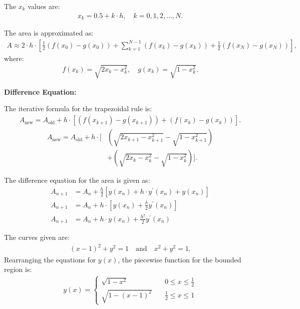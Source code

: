 \documentclass[journal]{IEEEtran}
\begin{document}
The $x_k$ values are:
\begin{align}
    x_k = 0.5 + k \cdot h, \quad k = 0, 1, 2, \dots, N.
\end{align}

The area is approximated as:
\begin{align}
    A \approx 2 \cdot h \cdot \left[ \frac{1}{2}(f(x_0) - g(x_0)) + \sum_{k=1}^{N-1} (f(x_k) - g(x_k)) + \frac{1}{2}(f(x_N) - g(x_N)) \right],
\end{align}
where:
\begin{align}
    f(x_k) = \sqrt{2x_k - x_k^2}, \quad g(x_k) = \sqrt{1 - x_k^2}.
\end{align}

\textbf{Difference Equation:}

The iterative formula for the trapezoidal rule is:
\begin{align}
    A_{\text{new}} = A_{\text{old}} + h \cdot \left[(f(x_{k+1}) - g(x_{k+1})) + (f(x_k) - g(x_k)) \right].
\end{align}
\begin{align}
    A_{\text{new}} = A_{\text{old}} + h \cdot \bigg[ & \left(\sqrt{2x_{k+1} - x_{k+1}^2} - \sqrt{1 - x_{k+1}^2}\right) \nonumber \\
    & + \left(\sqrt{2x_k - x_k^2} - \sqrt{1 - x_k^2}\right) \bigg].
\end{align}

The difference equation for the area is given as:
\begin{align}
    A_{n + 1} &= A_n + \frac{h}{2} \left[ y(x_n) + h \cdot y^{\prime}(x_n) + y(x_n) \right] \\
    A_{n + 1} &= A_n + h \cdot \left[ y(x_n) + \frac{h}{2} y^{\prime}(x_n) \right] \\
    A_{n + 1} &= A_n + h \cdot y(x_n) + \frac{h^2}{2} y^{\prime}(x_n)
\end{align}

The curves given are:
\begin{align}
    (x - 1)^2 + y^2 = 1 \quad \text{and} \quad x^2 + y^2 = 1.
\end{align}
Rearranging the equations for \( y(x) \), the piecewise function for the bounded region is:
\begin{align}
    y(x) =
    \begin{cases}
        \sqrt{1 - x^2} & \quad 0 \leq x \leq \frac{1}{2} \\
        \sqrt{1 - (x - 1)^2} & \quad \frac{1}{2} \leq x \leq 1
    \end{cases}
\end{align}
\end{document}
